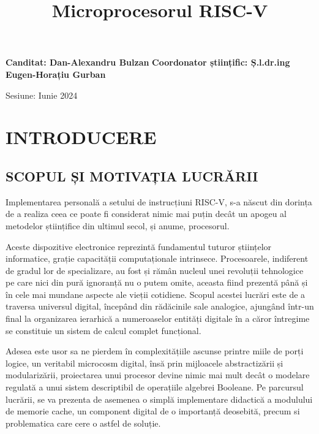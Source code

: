 \documentclass[12pt]{article}
\begin{document}
\fontsize{20pt}{18pt}\selectfont
\title{\textbf{Microprocesorul RISC-V}}
\date{}
\maketitle

\vspace*{150mm}


\begingroup
    \fontsize{14pt}{12pt}\selectfont
	\textbf{Canditat: Dan-Alexandru Bulzan}
	\bigbreak
	\textbf{Coordonator științific: Ș.l.dr.ing Eugen-Horațiu Gurban}
\endgroup


\vspace*{\fill}
\begin{center}
\fontsize{14pt}{12pt}\selectfont
Sesiune: Iunie 2024
\end{center}


\newpage
\section{\centering INTRODUCERE}
\bigbreak
\subsection{SCOPUL ȘI MOTIVAȚIA LUCRĂRII}

Implementarea personală a setului de instrucțiuni RISC-V, s-a născut din dorința de a realiza ceea ce poate fi considerat nimic mai puțin decât un apogeu al metodelor științifice din ultimul secol, și anume, procesorul.

Aceste dispozitive electronice reprezintă fundamentul tuturor științelor informatice, grație capacității computaționale intrinsece. Procesoarele, indiferent de gradul lor de specializare, au fost și rămân nucleul unei revoluții tehnologice pe care nici din pură ignoranță nu o putem omite, aceasta fiind prezentă până și în cele mai mundane aspecte ale vieții cotidiene.
Scopul acestei lucrări este de a traversa universul digital, începând din rădăcinile sale analogice, ajungând într-un final la organizarea ierarhică a numeroaselor entități digitale în a căror întregime se constituie un sistem de calcul complet funcțional.

Adesea este usor sa ne pierdem în complexitățiile ascunse printre miile de porți logice, un veritabil microcosm digital, însă prin mijloacele abstractizării și modularizării, proiectarea unui procesor devine nimic mai mult decât o modelare regulată a unui sistem descriptibil de operațiile algebrei Booleane. Pe parcursul lucrării, se va prezenta de asemenea o simplă implementare didactică a modulului de memorie cache, un component digital de o importanță deosebită, precum si problematica care cere o astfel de soluție.
\end{document}
